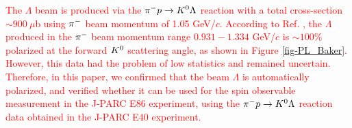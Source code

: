 \textcolor{red}{The $\Lambda$ beam is produced via the $\pi^- p \to K^0 \Lambda$ reaction with a total cross-section $\sim900\ \mu$b \cite{Baker} using $\pi^{-}$ beam momentum of 1.05 GeV/$c$. According to Ref. \cite{Baker}, the $\Lambda$ produced in the $\pi^{-}$ beam momentum range $0.931-1.334$ GeV/$c$ is $\sim100\%$ polarized at the forward $K^{0}$ scattering angle, as shown in Figure \ref{fig-PL_Baker}. However, this data had the problem of low statistics and remained uncertain. Therefore, in this paper, we confirmed that the beam $\Lambda$ is automatically polarized, and verified whether it can be used for the spin observable measurement in the J-PARC E86 experiment, using the $\pi^- p \to K^0 \Lambda$ reaction data obtained in the J-PARC E40 experiment.}

\begin{comment}

Figure \ref{fig-E86setup} shows the experimental setup of J-PARC E86 \cite{Miwa-LpProp}. To reconstruct $\Kz$, $\pP$ and $\pM$ from the $\kzdecay$ decay will be detected by the forward magnetic spectrometer (SKS) \cite{K1.8} and the CATCH system, respectively. \textcolor{red}{ The momentum resolution of SKS is $\Delta p/p = 10^{-3}$ (FWHM), which is 10 times better than KURAMA, which should improve the missing mass resolution. As a result, the S/N ratio of $\Lambda$ identification is expected to be improved. }


\end{comment}

